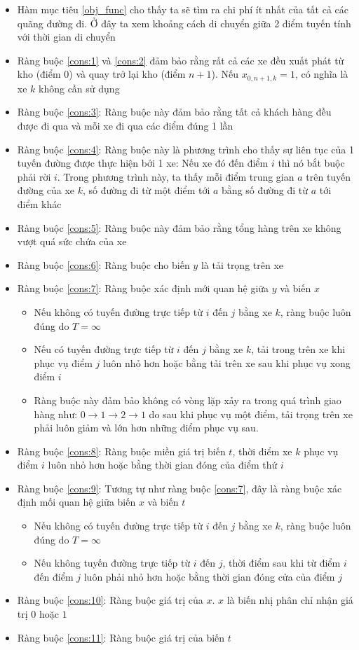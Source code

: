 \documentclass[12pt,a4paper]{article}\author{Nguyễn Nho Dũng}
\begin{document}
\begin{itemize}
	\item Hàm mục tiêu \ref{obj_func} cho thấy ta sẽ tìm ra chi phí ít nhất của tất cả các quãng đường đi. Ở đây ta xem khoảng cách di chuyển giữa 2 điểm tuyến tính với thời gian di chuyển
	\item Ràng buộc \ref{cons:1} và \ref{cons:2} đảm bảo rằng rất cả các xe đều xuất phát từ kho (điểm 0) và quay trở lại kho (điểm $n+1$). Nếu $x_{0, n+1, k} = 1$, có nghĩa là xe $k$ không cần sử dụng
	\item Ràng buộc \ref{cons:3}: Ràng buộc này đảm bảo rằng tất cả khách hàng đều được đi qua và mỗi xe đi qua các điểm đúng 1 lần
	\item Ràng buộc \ref{cons:4}: Ràng buộc này là phương trình cho thấy sự liên tục của 1 tuyến đường được thực hiện bởi 1 xe: Nếu xe đó đến điểm $i$ thì nó bắt buộc phải rời $i$. Trong phương trình này, ta thấy mỗi điểm trung gian $a$ trên tuyến đường của xe $k$, số đường đi từ một điểm tới $a$ bằng số đường đi từ $a$ tới điểm khác
	\item Ràng buộc \ref{cons:5}: Ràng buộc này đảm bảo rằng tổng hàng trên xe không vượt quá sức chứa của xe
	\item Ràng buộc \ref{cons:6}: Ràng buộc cho biến $y$ là tải trọng trên xe
	\item Ràng buộc \ref{cons:7}: Ràng buộc xác định mới quan hệ giữa $y$ và biến $x$
		\begin{itemize}
			\item Nếu không có tuyến đường trực tiếp từ $i$ đến $j$ bằng xe $k$, ràng buộc luôn đúng do $T = \infty$
			\item Nếu có tuyến đường trực tiếp từ $i$ đến $j$ bằng xe $k$, tải trong trên xe khi phục vụ điểm $j$ luôn nhỏ hơn hoặc bằng tải trên xe sau khi phục vụ xong điểm $i$
			\item Ràng buộc này đảm bảo không có vòng lặp xảy ra trong quá trình giao hàng như: $0\rightarrow 1 \rightarrow 2\rightarrow 1$ do sau khi phục vụ một điểm, tải trọng trên xe phải luôn giảm và lớn hơn những điểm phục vụ sau.
		\end{itemize}
	\item Ràng buộc \ref{cons:8}: Ràng buộc miền giá trị biến $t$, thời điểm xe $k$ phục vụ điểm $i$ luôn nhỏ hơn hoặc bằng thời gian đóng của điểm thứ $i$
	\item Ràng buộc \ref{cons:9}: Tương tự như ràng buộc \ref{cons:7}, đây là ràng buộc xác định mối quan hệ giữa biến $x$ và biến $t$
	\begin{itemize}
		\item Nếu không có tuyến đường trực tiếp từ $i$ đến $j$ bằng xe $k$, ràng buộc luôn đúng do $T = \infty$
		\item Nếu không tuyến đường trực tiếp từ $i$ đến $j$, thời điểm sau khi từ điểm $i$ đến điểm $j$ luôn phải nhỏ hơn hoặc bằng thời gian đóng cửa của điểm $j$
	\end{itemize}
	\item Ràng buộc \ref{cons:10}: Ràng buộc giá trị của $x$. $x$ là biến nhị phân chỉ nhận giá trị $0$ hoặc $1$
	\item Ràng buộc \ref{cons:11}: Ràng buộc giá trị của biến $t$
\end{itemize}
\end{document}
